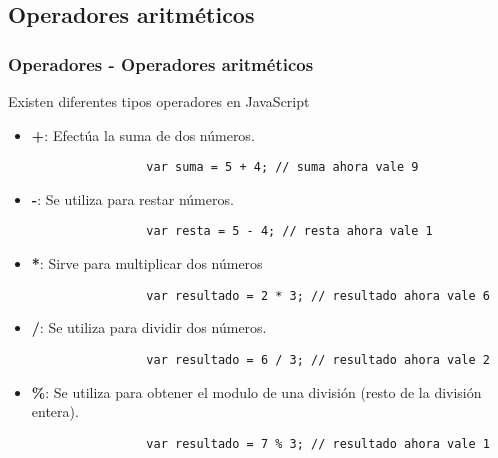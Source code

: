 \documentclass[handout, 10pt]{beamer}
\begin{document}
\subsection{Operadores aritméticos}
\begin{frame}[fragile]
	\frametitle{Operadores - Operadores aritméticos}
	Existen diferentes tipos operadores en JavaScript
	\begin{itemize}
		\pause \item \textbf{+}: Efectúa la suma de dos números.
			\begin{lstlisting}
				var suma = 5 + 4; // suma ahora vale 9
			\end{lstlisting}
		
		\pause \item \textbf{-}: Se utiliza para restar números.
			\begin{lstlisting}
				var resta = 5 - 4; // resta ahora vale 1
			\end{lstlisting}
		
		\pause \item \textbf{*}: Sirve para multiplicar dos números
			\begin{lstlisting}
				var resultado = 2 * 3; // resultado ahora vale 6
			\end{lstlisting}
		
		\pause \item \textbf{/}: Se utiliza para dividir dos números.
			\begin{lstlisting}
				var resultado = 6 / 3; // resultado ahora vale 2
			\end{lstlisting}
		
		\pause \item \textbf{\%}: Se utiliza para obtener el modulo de una división (resto de la división entera).
			\begin{lstlisting}
				var resultado = 7 % 3; // resultado ahora vale 1
			\end{lstlisting}
	\end{itemize}
\end{frame}
\end{document}
